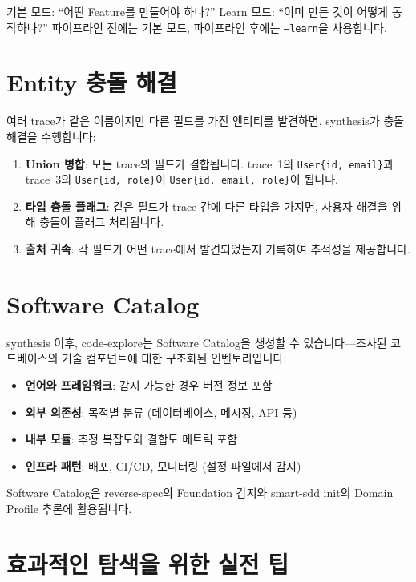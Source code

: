 \documentclass[11pt,a4paper,openright,twoside]{report}
\begin{document}
\begin{tipbox}[기본 모드 vs Learn 모드]
기본 모드: ``어떤 Feature를 만들어야 하나?'' Learn 모드: ``이미 만든 것이 어떻게 동작하나?'' 파이프라인 전에는 기본 모드, 파이프라인 후에는 \texttt{--learn}을 사용합니다.
\end{tipbox}

\section{Entity 충돌 해결}

여러 trace가 같은 이름이지만 다른 필드를 가진 엔티티를 발견하면, synthesis가 충돌 해결을 수행합니다:

\begin{enumerate}
  \item \textbf{Union 병합}: 모든 trace의 필드가 결합됩니다. trace~1의 \texttt{User\{id, email\}}과 trace~3의 \texttt{User\{id, role\}}이 \texttt{User\{id, email, role\}}이 됩니다.
  \item \textbf{타입 충돌 플래그}: 같은 필드가 trace 간에 다른 타입을 가지면, 사용자 해결을 위해 충돌이 플래그 처리됩니다.
  \item \textbf{출처 귀속}: 각 필드가 어떤 trace에서 발견되었는지 기록하여 추적성을 제공합니다.
\end{enumerate}

\section{Software Catalog}

synthesis 이후, code-explore는 Software Catalog을 생성할 수 있습니다---조사된 코드베이스의 기술 컴포넌트에 대한 구조화된 인벤토리입니다:

\begin{itemize}
  \item \textbf{언어와 프레임워크}: 감지 가능한 경우 버전 정보 포함
  \item \textbf{외부 의존성}: 목적별 분류 (데이터베이스, 메시징, API 등)
  \item \textbf{내부 모듈}: 추정 복잡도와 결합도 메트릭 포함
  \item \textbf{인프라 패턴}: 배포, CI/CD, 모니터링 (설정 파일에서 감지)
\end{itemize}

Software Catalog은 reverse-spec의 Foundation 감지와 smart-sdd init의 Domain Profile 추론에 활용됩니다.

\section{효과적인 탐색을 위한 실전 팁}
\end{document}
